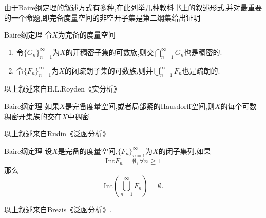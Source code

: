 \documentclass[lang=cn,18pt]{elegantbook}
\begin{document}
由于Baire纲定理的叙述方式有多种,在此列举几种教科书上的叙述形式,并对最重要的一个命题,即完备度量空间的非空开子集是第二纲集给出证明


\begin{theorem}{\textreferencemark Baire纲定理}
    令$X$为完备的度量空间
    \begin{enumerate}
        \item 令$\{G_n\}_{n=1}^{\infty}$为$X$的开稠密子集的可数族,则交$\bigcap\limits_{n=1}^{\infty}G_n$也是稠密的.
        \item 令$\{F_n\}_{n=1}^{\infty}$为$X$的闭疏朗子集的可数族,则并$\bigcup\limits_{n=1}^{\infty}F_n$也是疏朗的.
    \end{enumerate}
\end{theorem}
\begin{note}
    以上叙述来自H.L.Royden《实分析》
\end{note}

\begin{theorem}{\textreferencemark Baire纲定理}
    如果$X$是完备度量空间,或者局部紧的Hausdorff空间,则$X$的每个可数稠密开集族的交在$X$中稠密.
\end{theorem}
\begin{note}
    以上叙述来自Rudin《泛函分析》
\end{note}

\begin{theorem}{\textreferencemark Baire纲定理}
    设$X$是完备的度量空间,$\{F_n\}_{n=1}^{\infty}$为$X$的闭子集列,如果
    $$\text{Int}F_n=\emptyset,\forall n \geqslant 1$$
    那么
    $$\text{Int}(\bigcup\limits_{n=1}^{\infty}F_n)=\emptyset.$$
\end{theorem}
\begin{note}
    以上叙述来自Brezis《泛函分析》.
\end{note}
\end{document}
